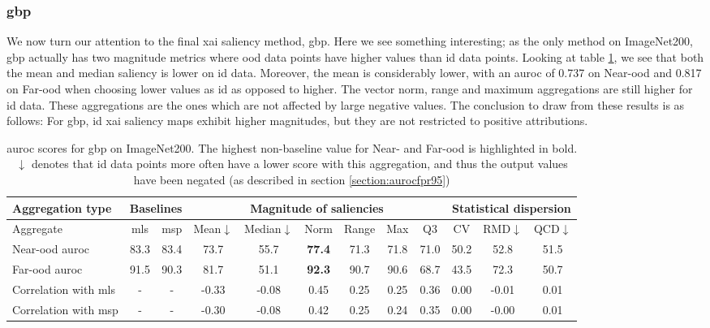 \documentclass[UKenglish]{uiomasterthesis} %
\theoremstyle{definition}
\begin{document}
\subsubsection{\ac*{gbp}}

We now turn our attention to the final \ac{xai} saliency method, \ac{gbp}. Here we see something interesting; as the only method on ImageNet200, \ac{gbp} actually has two magnitude metrics where \ac{ood} data points have higher values than \ac{id} data points. Looking at table \ref{table:imagenet200_gbp_metrics}, we see that both the mean and median saliency is lower on \ac{id} data. Moreover, the mean is considerably lower, with an \ac{auroc} of 0.737 on Near-\ac{ood} and 0.817 on Far-\ac{ood} when choosing lower values as \ac{id} as opposed to higher. The vector norm, range and maximum aggregations are still higher for \ac{id} data. These aggregations are the ones which are not affected by large negative values. The conclusion to draw from these results is as follows: For \ac{gbp}, \ac{id} \ac{xai} saliency maps exhibit higher magnitudes, but they are not restricted to positive attributions.

\begin{table}[H]
\setlength\tabcolsep{3pt}
\begin{center}
\begin{tabular}{ |p{5.1em}|c c|c c c c c c|c c c| }
    \hline
     \centering Aggregation type & \multicolumn{2}{c|}{Baselines} & \multicolumn{6}{c|}{Magnitude of saliencies} & \multicolumn{3}{p{8em}|}{\centering Statistical dispersion} \\
    \hline
    Aggregate & \ac{mls} & \ac{msp} & Mean$\downarrow$ & Median$\downarrow$ & Norm & Range & Max & Q3 & CV & RMD$\downarrow$ & QCD$\downarrow$  \\
    \hline
    \rowcolor{near!50}
    Near-\ac{ood} \ac{auroc} & 83.3 & 83.4 & 73.7 & 55.7 &\textbf{ 77.4 }& 71.3 & 71.8 & 71.0 & 50.2 & 52.8 & 51.5  \\
    \hline
    \rowcolor{far!50}
    Far-\ac{ood} \ac{auroc} & 91.5 & 90.3 & 81.7 & 51.1 &\textbf{ 92.3 }& 90.7 & 90.6 & 68.7 & 43.5 & 72.3 & 50.7  \\
    \hline
    Correlation with \ac{mls}& - & - & -0.33 & -0.08 & 0.45 & 0.25 & 0.25 & 0.36 & 0.00 & -0.01 & 0.01  \\
    \hline
    Correlation with \ac{msp}& - & - & -0.30 & -0.08 & 0.42 & 0.25 & 0.24 & 0.35 & 0.00 & -0.00 & 0.01  \\
    \hline
    \end{tabular}
    \caption[\ac{auroc} scores for \ac{gbp} on ImageNet200]{\ac{auroc} scores for \ac{gbp} on ImageNet200. The highest non-baseline value for Near- and Far-\ac{ood} is highlighted in bold. $\downarrow$ denotes that \ac{id} data points more often have a lower score with this aggregation, and thus the output values have been negated (as described in section \ref{section:aurocfpr95})}
    \label{table:imagenet200_gbp_metrics}
\end{center}
\setlength\tabcolsep{6pt}
\end{table}
\end{document}
